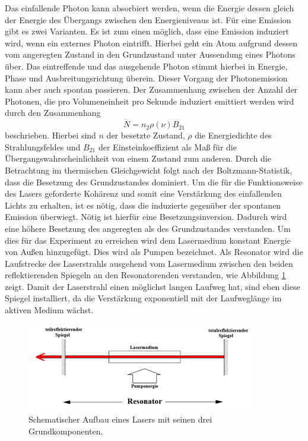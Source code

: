 Das einfallende Photon kann absorbiert werden, wenn die Energie dessen gleich der Energie des Übergangs zwischen den Energieniveaus ist.
Für eine Emission gibt es zwei Varianten.
Es ist zum einen möglich, dass eine Emission induziert wird, wenn ein externes Photon eintrifft.
Hierbei geht ein Atom aufgrund dessen vom angeregten Zustand in den Grundzustand unter Aussendung eines Photons über.
Das eintreffende und das ausgehende Photon stimmt hierbei in Energie, Phase und Ausbreitungsrichtung überein.
Dieser Vorgang der Photonemission kann aber auch spontan passieren.
Der Zusammenhang zwischen der Anzahl der Photonen, die pro Volumeneinheit pro Sekunde induziert emittiert werden wird durch den Zusammenhang
\begin{equation}
  \dot{N} = n_2\rho(\nu)B_\text{21}
\end{equation}
beschrieben.
Hierbei sind $n$ der besetzte Zustand, $\rho$ die Energiedichte des Strahlungsfeldes und $B_\text{21}$ der Einsteinkoeffizient als Maß für die Übergangswahrscheinlichkeit von einem Zustand zum anderen.
Durch die Betrachtung im thermischen Gleichgewicht folgt nach der Boltzmann-Statistik, dass die Besetzung des Grundzustandes dominiert.
Um die für die Funktionsweise des Lasers geforderte Kohärenz und somit eine Verstärkung des einfallenden Lichts zu erhalten, ist es nötig, dass die induzierte gegenüber der spontanen Emission überwiegt.
Nötig ist hierfür eine Besetzungsinversion.
Dadurch wird eine höhere Besetzung des angeregten als des Grundzustandes verstanden.
Um dies für das Experiment zu erreichen wird dem Lasermedium konstant Energie von Außen hinzugefügt.
Dies wird als Pumpen bezeichnet.
Als Resonator wird die Laufstrecke des Laserstrahls ausgehend vom Lasermedium zwischen den beiden reflektierenden Spiegeln an den Resonatorenden verstanden, wie Abbildung \ref{fig:resonator} zeigt.
Damit der Laserstrahl einen möglichst langen Laufweg hat, sind eben diese Spiegel installiert, da die Verstärkung exponentiell mit der Laufweglänge im aktiven Medium wächst.

\begin{figure}[H]
  \centering
  \includegraphics[width=0.9\textwidth]{Bilder/resonator.png}
  \caption{Schematischer Aufbau eines Lasers mit seinen drei Grundkomponenten.\cite{anleitung}}
  \label{fig:resonator}
\end{figure}

